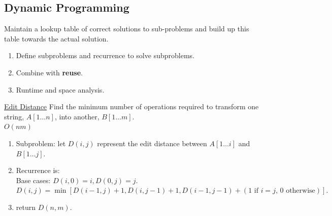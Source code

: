 \documentclass[10pt,a4paper]{article}
\begin{document}
\begin{multicols}{3}
    \section{Dynamic Programming}

    \begin{textbox}{}
         Maintain a lookup table of correct solutions to sub-problems and build up this table towards the actual solution.\\
        \begin{enumerate}
            \item Define subproblems and recurrence to solve subproblems.
            \item Combine with {\bf reuse}.
            \item Runtime and space analysis.
        \end{enumerate}
    \end{textbox}

    \begin{textbox}{\href{https://leetcode.com/problems/edit-distance/}{Edit Distance}}
        Find the minimum number of operations required to transform one string, $A[1\ldots n]$, into another, $B[1\ldots m]$. \\
          $O(nm)$
        \begin{enumerate}
            \item Subproblem: let $D(i,j)$ represent the edit distance between $A[1\ldots i]$ and $B[1\ldots j]$.
            \item Recurrence is: \\
                  Base cases: $D(i,0) = i, D(0,j) = j.$ \\
                  $D(i,j) = \min[D(i-1,j)+1,D(i,j-1)+1,D(i-1,j-1)+ (1 \text { if } i = j \text {, $0$ otherwise})].$
            \item return $D(n,m)$.
        \end{enumerate}
    \end{textbox}


\end{multicols}
\end{document}
